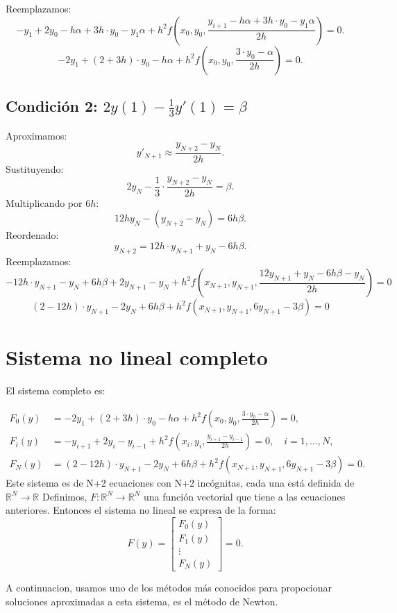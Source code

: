\documentclass[11pt]{article}
\begin{document}
 Reemplazamos: 
\[
- y_{1} + 2y_0 -  h \alpha + 3h \cdot y_0 - y_1\alpha + h^2 f\left(x_0, y_0, \frac{y_{i+1} -  h \alpha + 3h \cdot y_0 - y_1\alpha}{2h} \right) = 0.
\]
\[
-2 y_{1} + (2+3h) \cdot y_0 -  h \alpha  + h^2 f\left(x_0, y_0, \frac{ 3 \cdot y_0 - \alpha}{2h} \right) = 0.
\]
\subsection*{Condición 2: \( 2y(1) - \frac{1}{3}y'(1) = \beta \)}

Aproximamos:
\[
y'_{N+1} \approx \frac{y_{N+2} - y_{N}}{2h}.
\]
Sustituyendo:
\[
2y_N - \frac{1}{3} \cdot \frac{y_{N+2} - y_{N}}{2h} = \beta.
\]
Multiplicando por \( 6h \):
\[
12h y_N - (y_{N+2} - y_{N}) = 6h \beta.
\]
Reordenado:
\[
y_{N+2}=12h \cdot y_{N+1} + y_N - 6h \beta.
\]
Reemplazamos:
\[
-12h \cdot y_{N+1} - y_N + 6h \beta+2y_{N+1}-y_{N}+ h^2 f(x_{N+1}, y_{N+1},\frac{12y_{N+1}+y_N-6h\beta-y_N}{2h})=0
\]
\[
(2-12h) \cdot y_{N+1} -2 y_N + 6h \beta+ h^2 f(x_{N+1}, y_{N+1},6y_{N+1}-3\beta)=0
\]


\section{Sistema no lineal completo}

El sistema completo es:

\begin{align*}
F_0(y) &= -2 y_{1} + (2+3h) \cdot y_0 -  h \alpha  + h^2 f\left(x_0, y_0, \frac{ 3 \cdot y_0 - \alpha}{2h} \right) = 0, \\
F_i(y) &=- y_{i+1} + 2y_i - y_{i-1} + h^2 f\left(x_i, y_i, \frac{y_{i+1} - y_{i-1}}{2h} \right) = 0, \quad i = 1, \dots, N, \\
F_N(y) &= (2-12h) \cdot y_{N+1} -2 y_N + 6h \beta+ h^2 f(x_{N+1}, y_{N+1},6y_{N+1}-3\beta)=0.
\end{align*}
 Este sistema es de N+2 ecuaciones con N+2 incógnitas, cada una está definida de$ \mathbb{R}^{N} \to \mathbb{R}$
Definimos, $F : \mathbb{R}^{N} \to \mathbb{R}^{N}$ una función vectorial que tiene a las ecuaciones anteriores. Entonces el sistema no lineal se expresa de la forma:
\[
  \quad F(y) = \begin{bmatrix} F_0(y) \\ F_1(y) \\ \vdots \\ F_N(y) \end{bmatrix}=0.
\]

A continuacion, usamos uno de los métodos más conocidos para propocionar soluciones aproximadas a esta sistema, es el método de Newton. 
\end{document}
